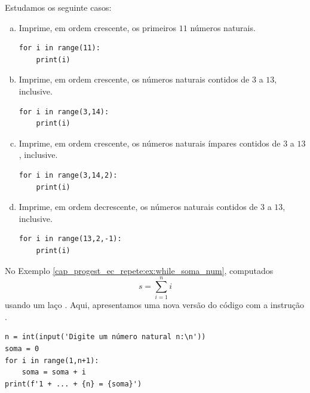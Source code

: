 \begin{ex}
  Estudamos os seguinte casos:
  \begin{enumerate}[a)]
  \item Imprime, em ordem crescente, os primeiros $11$ números naturais.

\begin{lstlisting}[xrightmargin=2.5em]
for i in range(11):
    print(i)
\end{lstlisting}

\item Imprime, em ordem crescente, os números naturais contidos de $3$ a $13$, inclusive.

\begin{lstlisting}[xrightmargin=2.5em]
for i in range(3,14):
    print(i)
\end{lstlisting}

\item Imprime, em ordem crescente, os números naturais ímpares contidos de $3$ a $13$, inclusive.

\begin{lstlisting}[xrightmargin=2.5em]
for i in range(3,14,2):
    print(i)
\end{lstlisting}

\item Imprime, em ordem decrescente, os números naturais contidos de $3$ a $13$, inclusive.

\begin{lstlisting}[xrightmargin=2.5em]
for i in range(13,2,-1):
    print(i)
\end{lstlisting}

\end{enumerate}

\end{ex}

\begin{ex}\label{cap_progest_ec_repete:ex:for_soma_num}
  No Exemplo \ref{cap_progest_ec_repete:ex:while_soma_num}, computados
  \begin{equation}
    s = \sum_{i=1}^n i
  \end{equation}
  usando um laço {\PYTHONwhile}. Aqui, apresentamos uma nova versão do código com a instrução {\PYTHONfor}.

\begin{lstlisting}
n = int(input('Digite um número natural n:\n'))
soma = 0
for i in range(1,n+1):
    soma = soma + i
print(f'1 + ... + {n} = {soma}')
\end{lstlisting}

\end{ex}

